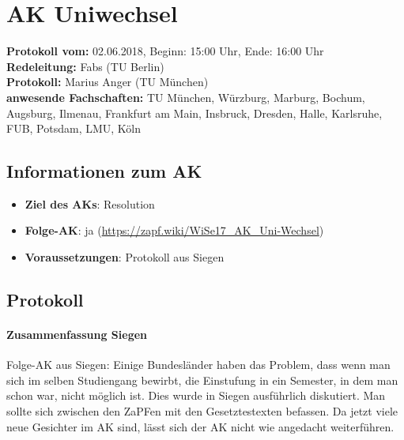 
\section{AK Uniwechsel}

  \textbf{Protokoll vom:} 02.06.2018, %
  Beginn: 15:00 Uhr,
  Ende: 16:00 Uhr \\
  \textbf{Redeleitung:} Fabs (TU Berlin) \\
  \textbf{Protokoll:} Marius Anger (TU München) \\
  \textbf{anwesende Fachschaften:} TU München, Würzburg, Marburg, Bochum, Augsburg, Ilmenau, Frankfurt am Main, Insbruck, Dresden, Halle, Karlsruhe, FUB, Potsdam, LMU, Köln

  \subsection*{Informationen zum AK}
    \begin{itemize}
      \item \textbf{Ziel des AKs}: Resolution
      \item \textbf{Folge-AK}: ja (\url{https://zapf.wiki/WiSe17_AK_Uni-Wechsel})
      \item \textbf{Voraussetzungen}: Protokoll aus Siegen
    \end{itemize}

  \subsection*{Protokoll}
      \paragraph{Zusammenfassung Siegen}
        Folge-AK aus Siegen: Einige Bundesländer haben das Problem, dass wenn man sich im selben Studiengang bewirbt, die Einstufung in ein Semester, in dem man schon war, nicht möglich ist.
        Dies wurde in Siegen ausführlich diskutiert. Man sollte sich zwischen den ZaPFen mit den Gesetztestexten befassen. Da jetzt viele neue Gesichter im AK sind, lässt sich der AK nicht wie angedacht weiterführen.

